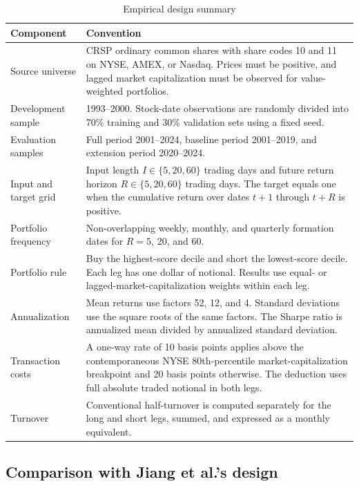 \begin{table}[htbp]
\centering
\caption{Empirical design summary}
\label{tab:app_design_summary}
\small
\begin{tabularx}{\textwidth}{@{}p{}L@{}}
\toprule
Component & Convention \\
\midrule
Source universe & CRSP ordinary common shares with share codes 10 and 11 on NYSE, AMEX, or Nasdaq. Prices must be positive, and lagged market capitalization must be observed for value-weighted portfolios. \\
Development sample & 1993--2000. Stock-date observations are randomly divided into 70\% training and 30\% validation sets using a fixed seed. \\
Evaluation samples & Full period 2001--2024, baseline period 2001--2019, and extension period 2020--2024. \\
Input and target grid & Input length $I\in\{5,20,60\}$ trading days and future return horizon $R\in\{5,20,60\}$ trading days. The target equals one when the cumulative return over dates $t+1$ through $t+R$ is positive. \\
Portfolio frequency & Non-overlapping weekly, monthly, and quarterly formation dates for $R=5$, 20, and 60. \\
Portfolio rule & Buy the highest-score decile and short the lowest-score decile. Each leg has one dollar of notional. Results use equal- or lagged-market-capitalization weights within each leg. \\
Annualization & Mean returns use factors 52, 12, and 4. Standard deviations use the square roots of the same factors. The Sharpe ratio is annualized mean divided by annualized standard deviation. \\
Transaction costs & A one-way rate of 10 basis points applies above the contemporaneous NYSE 80th-percentile market-capitalization breakpoint and 20 basis points otherwise. The deduction uses full absolute traded notional in both legs. \\
Turnover & Conventional half-turnover is computed separately for the long and short legs, summed, and expressed as a monthly equivalent. \\
\bottomrule
\end{tabularx}
\end{table}

\subsection{Comparison with Jiang et al.'s design}


